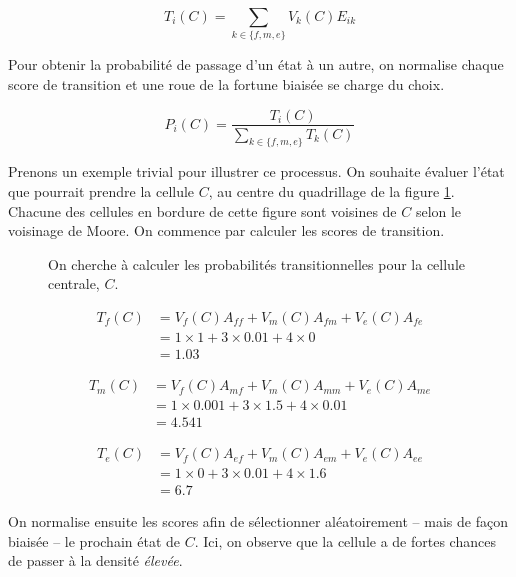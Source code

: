 \documentclass[12pt]{article}
\begin{document}
\begin{equation}
T_i(C) = \sum_{k \in \{f,m,e\}} V_k(C) E_{ik}
\label{eq:transition}
\end{equation}

Pour obtenir la probabilité de passage d'un état à un autre, on
normalise chaque score de transition et une roue de la fortune biaisée
se charge du choix.

\begin{equation}
P_i(C) = \frac{T_i(C)}{\sum_{k \in \{f,m,e\}} T_k(C)}
\label{eq:normalisation}
\end{equation}

Prenons un exemple trivial pour illustrer ce processus. On souhaite
évaluer l'état que pourrait prendre la cellule $C$, au centre du
quadrillage de la figure \ref{fig:ca-example}. Chacune des cellules en
bordure de cette figure sont voisines de $C$ selon le voisinage de
Moore. On commence par calculer les scores de transition.

\begin{figure}[!ht]
  \centering
  
  \caption{On cherche à calculer les probabilités transitionnelles
    pour la cellule centrale, $C$.}
  \label{fig:ca-example}
\end{figure}

\begin{align*}
T_f(C) &= V_f(C) A_{ff} + V_m(C) A_{fm} + V_e(C) A_{fe} \\
       &= 1 \times 1 + 3 \times 0.01 + 4 \times 0 \\
       &= 1.03
\end{align*}

\begin{align*}
T_m(C) &= V_f(C) A_{mf} + V_m(C) A_{mm} + V_e(C) A_{me} \\
       &= 1 \times 0.001 + 3 \times 1.5 + 4 \times 0.01 \\
       &= 4.541
\end{align*}

\begin{align*}
T_e(C) &= V_f(C) A_{ef} + V_m(C) A_{em} + V_e(C) A_{ee} \\
       &= 1 \times 0 + 3 \times 0.01 + 4 \times 1.6 \\
       &= 6.7
\end{align*}

On normalise ensuite les scores afin de sélectionner aléatoirement --
mais de façon biaisée -- le prochain état de $C$. Ici, on observe que
la cellule a de fortes chances de passer à la densité \textit{élevée}.
\end{document}
